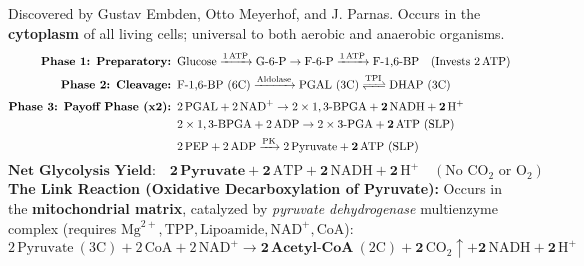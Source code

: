 \documentclass[10pt,a4paper]{article}
\begin{document}
\begin{formulabox}
Discovered by Gustav Embden, Otto Meyerhof, and J. Parnas. Occurs in the \textbf{cytoplasm} of all living cells; universal to both aerobic and anaerobic organisms.
\begin{align*}
  \textbf{Phase 1: Preparatory: } & \text{Glucose} \xrightarrow{1\,\text{ATP}} \text{G-6-P} \to \text{F-6-P} \xrightarrow{1\,\text{ATP}} \text{F-1,6-BP} \quad (\text{Invests } 2\,\mathrm{ATP})\\
  \textbf{Phase 2: Cleavage: } & \text{F-1,6-BP}\ (6\mathrm{C}) \xrightarrow{\text{Aldolase}} \text{PGAL}\ (3\mathrm{C}) \xrightleftharpoons{\text{TPI}} \text{DHAP}\ (3\mathrm{C})\\
  \textbf{Phase 3: Payoff Phase (x2): } & 2\,\text{PGAL} + 2\,\mathrm{NAD}^+ \to 2 \times 1,3\text{-BPGA} + \mathbf{2\,\mathrm{NADH} + 2\,\mathrm{H}^+}\\
  & 2 \times 1,3\text{-BPGA} + 2\,\mathrm{ADP} \to 2 \times 3\text{-PGA} + \mathbf{2\,\mathrm{ATP}} \ (\text{SLP})\\
  & 2\,\text{PEP} + 2\,\mathrm{ADP} \xrightarrow{\text{PK}} 2\,\text{Pyruvate} + \mathbf{2\,\mathrm{ATP}} \ (\text{SLP})
\end{align*}
\begin{equation}
  \textbf{Net Glycolysis Yield:} \quad \mathbf{2\,\text{Pyruvate}} + \mathbf{2\,\mathrm{ATP}} + \mathbf{2\,\mathrm{NADH} + 2\,\mathrm{H}^+} \quad (\text{No } \mathrm{CO}_2 \text{ or } \mathrm{O}_2)
\end{equation}
\textbf{The Link Reaction (Oxidative Decarboxylation of Pyruvate):}
Occurs in the \textbf{mitochondrial matrix}, catalyzed by \textit{pyruvate dehydrogenase} multienzyme complex (requires $\mathrm{Mg}^{2+}, \text{TPP}, \text{Lipoamide}, \mathrm{NAD}^+, \text{CoA}$):
\begin{equation}
  2\,\text{Pyruvate}\ (3\mathrm{C}) + 2\,\mathrm{CoA} + 2\,\mathrm{NAD}^+ \longrightarrow \mathbf{2\,\text{Acetyl-CoA}}\ (2\mathrm{C}) + \mathbf{2\,\mathrm{CO_2}} \uparrow + \mathbf{2\,\mathrm{NADH} + 2\,\mathrm{H}^+}
\end{equation}
\end{formulabox}
\end{document}
